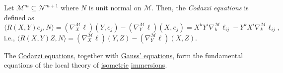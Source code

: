 \begin{remark}\label{rmk:Codazzi}
	Let \(\mathcal{M} ^m \subseteq \mathcal{N} ^{m+1}\) where \(N\) is unit normal on \(\mathcal{M} \). Then, the \emph{Codazzi equations} is defined as
	\begin{equation}\label{eq:Codazzi}
		\langle R(X, Y) e_j , N \rangle
		= (\nabla _X ^{\mathcal{M} } \ell ) (Y, e_j) - (\nabla _Y ^{\mathcal{M} } \ell )(X, e_j)
		= X^k Y^i \nabla _k^{\mathcal{M} } \ell _{ij} - Y^k X^i \nabla _k^{\mathcal{M} } \ell _{ij},
	\end{equation}
	i.e., \(\langle R(X, Y) Z, N \rangle = (\nabla _X^{\mathcal{M} } \ell )(Y, Z) - (\nabla _Y^{\mathcal{M} } \ell )(X, Z)\).
\end{remark}

The \hyperref[eq:Codazzi]{Codazzi equations}, together with \hyperref[thm:Gauss-equations]{Gauss' equations}, form the fundamental equations of the local theory of \hyperref[def:isometry]{isometric} \hyperref[def:immersion]{immersions}.
